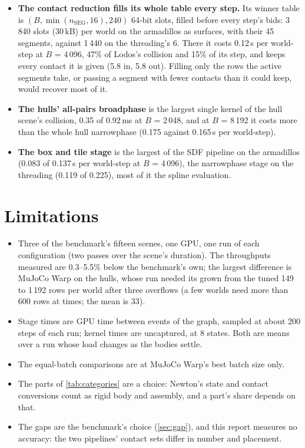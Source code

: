 \begin{itemize}
\item \textbf{The contact reduction fills its whole table every step.} Its winner table is $(B, \min(n_{\mathrm{SEG}}, 16), 240)$ 64-bit slots, filled before every step's bids: 3\,840 slots (30\,kB) per world on the armadillos as surfaces, with their 45 segments, against 1\,440 on the threading's 6. There it costs 0.12\,\micro s per world-step at $B$ = 4\,096, 47\% of Lodos's collision and 15\% of its step, and keeps every contact it is given (5.8 in, 5.8 out). Filling only the rows the active segments take, or passing a segment with fewer contacts than it could keep, would recover most of it.
\item \textbf{The hulls' all-pairs broadphase} is the largest single kernel of the hull scene's collision, 0.35 of 0.92\,ms at $B$ = 2\,048, and at $B$ = 8\,192 it costs more than the whole hull narrowphase (0.175 against 0.165\,\micro s per world-step).
\item \textbf{The box and tile stage} is the largest of the SDF pipeline on the armadillos (0.083 of 0.137\,\micro s per world-step at $B$ = 4\,096), the narrowphase stage on the threading (0.119 of 0.225), most of it the spline evaluation.
\end{itemize}

\section{Limitations}\label{sec:limits}

\begin{itemize}
\item Three of the benchmark's fifteen scenes, one GPU, one run of each configuration (two passes over the scene's duration). The throughputs measured are 0.3--5.5\% below the benchmark's own; the largest difference is MuJoCo Warp on the hulls, whose run needed its  grown from the tuned 149 to 1\,192 rows per world after three overflows (a few worlds need more than 600 rows at times; the mean is 33).
\item Stage times are GPU time between events of the graph, sampled at about 200 steps of each run; kernel times are uncaptured, at 8 states. Both are means over a run whose load changes as the bodies settle.
\item The equal-batch comparisons are at MuJoCo Warp's best batch size only.
\item The parts of \cref{tab:categories} are a choice: Newton's state and contact conversions count as rigid body and assembly, and a part's share depends on that.
\item The gaps are the benchmark's choice (\cref{sec:gap}), and this report measures no accuracy: the two pipelines' contact sets differ in number and placement.
\end{itemize}

